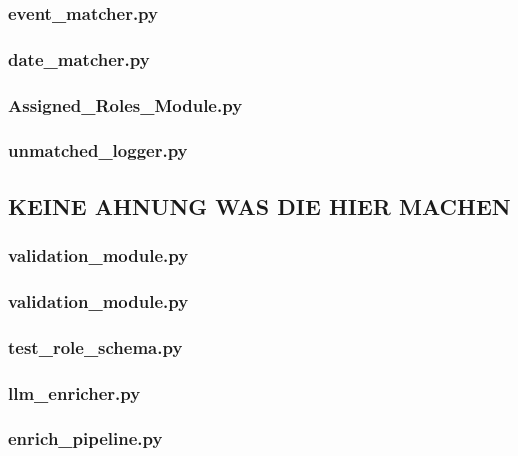 \documentclass[12pt, a4paper, ngerman, bidi=default]{article}
\begin{document}
\subsubsection{event\_matcher.py}



\subsubsection{date\_matcher.py}
\subsubsection{Assigned\_Roles\_Module.py}



\subsubsection{unmatched\_logger.py}

\subsection{KEINE AHNUNG WAS DIE HIER MACHEN}
\subsubsection{validation\_module.py}
\subsubsection{validation\_module.py}
\subsubsection{test\_role\_schema.py}
\subsubsection{llm\_enricher.py}
\subsubsection{enrich\_pipeline.py}


\end{document}
